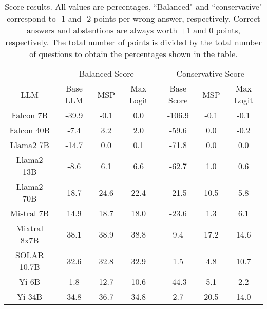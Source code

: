 \renewcommand\arraystretch{1.2}
\begin{table*}
\centering
\begin{tabular}{c|c|c|c|c|c|c}
& \multicolumn{3}{c|}{Balanced Score} & \multicolumn{3}{c}{Conservative Score} \\ 
LLM & Base LLM & MSP & Max Logit & Base Score & MSP & Max Logit\\ \hline
Falcon 7B & -39.9 & -0.1 & 0.0 & -106.9 & -0.1 & -0.1\\
Falcon 40B & -7.4 & 3.2 & 2.0 & -59.6 & 0.0 & -0.2\\
Llama2 7B & -14.7 & 0.0 & 0.1 & -71.8 & 0.0 & 0.0\\
Llama2 13B & -8.6 & 6.1 & 6.6 & -62.7 & 1.0 & 0.6\\
Llama2 70B & 18.7 & 24.6 & 22.4 & -21.5 & 10.5 & 5.8\\
Mistral 7B & 14.9 & 18.7 & 18.0 & -23.6 & 1.3 & 6.1\\
Mixtral 8x7B & 38.1 & 38.9 & 38.8 & 9.4 & 17.2 & 14.6\\
SOLAR 10.7B & 32.6 & 32.8 & 32.9 & 1.5 & 4.8 & 10.7\\
Yi 6B & 1.8 & 12.7 & 10.6 & -44.3 & 5.1 & 2.2\\
Yi 34B & 34.8 & 36.7 & 34.8 & 2.7 & 20.5 & 14.0\\
\hline
\end{tabular}
\caption{Score results. All values are percentages. ``Balanced" and ``conservative" correspond to -1 and -2 points per wrong answer, respectively. Correct answers and abstentions are always worth +1 and 0 points, respectively. The total number of points is divided by the total number of questions to obtain the percentages shown in the table.}
\label{tab:score}
\end{table*}
